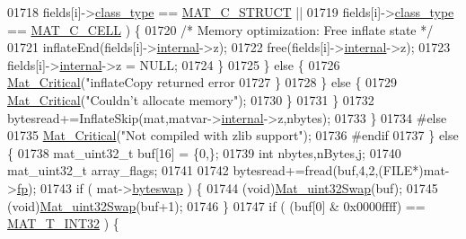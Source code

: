 \begin{DoxyCode}
{{{{{{{{{{{{{{01718                              fields[i]->\hyperlink{group___m_a_t_aff13035bf3265dd7d9425e5d40c839d4}{class\_type} == \hyperlink{group___m_a_t_ggad4d60ae7b709fc81bfd744fb4c857c40acb467c7749c80902b798134c729bb521}{MAT\_C\_STRUCT} ||
01719                              fields[i]->\hyperlink{group___m_a_t_aff13035bf3265dd7d9425e5d40c839d4}{class\_type} == \hyperlink{group___m_a_t_ggad4d60ae7b709fc81bfd744fb4c857c40a2f7abb47a1c51e248bd4e5e03cc81b08}{MAT\_C\_CELL} ) \{
01720                             \textcolor{comment}{/* Memory optimization: Free inflate state */}
01721                             inflateEnd(fields[i]->\hyperlink{namespaceinternal}{internal}->z);
01722                             free(fields[i]->\hyperlink{namespaceinternal}{internal}->z);
01723                             fields[i]->\hyperlink{group___m_a_t_a6e97e3ed9f40c49322c18561c2a94e92}{internal}->z = NULL;
01724                         \}
01725                     \} \textcolor{keywordflow}{else} \{
01726                         \hyperlink{group__mat__util_gaf51f2bfbb5580f575e4dd79757e2b80c}{Mat\_Critical}(\textcolor{stringliteral}{"inflateCopy returned error %
01727                     \}
01728                 \} \textcolor{keywordflow}{else} \{
01729                     \hyperlink{group__mat__util_gaf51f2bfbb5580f575e4dd79757e2b80c}{Mat\_Critical}(\textcolor{stringliteral}{"Couldn't allocate memory"});
01730                 \}
01731             \}
01732             bytesread+=InflateSkip(mat,matvar->\hyperlink{group___m_a_t_a6e97e3ed9f40c49322c18561c2a94e92}{internal}->z,nbytes);
01733         \}
01734 \textcolor{preprocessor}{#else}
01735         \hyperlink{group__mat__util_gaf51f2bfbb5580f575e4dd79757e2b80c}{Mat\_Critical}(\textcolor{stringliteral}{"Not compiled with zlib support"});
01736 \textcolor{preprocessor}{#endif}
01737     \} \textcolor{keywordflow}{else} \{
01738         mat\_uint32\_t buf[16] = \{0,\};
01739         \textcolor{keywordtype}{int} nbytes,nBytes,j;
01740         mat\_uint32\_t array\_flags;
01741 
01742         bytesread+=fread(buf,4,2,(FILE*)mat->\hyperlink{struct__mat__t_a85f562e407ca9ad4d2a6e14f839432b7}{fp});
01743         \textcolor{keywordflow}{if} ( mat->\hyperlink{struct__mat__t_a99d207977af5e04941ace56d71817a40}{byteswap} ) \{
01744             (void)\hyperlink{endian_8c_a8cb0d0750e2eaf9840d95db531934f4f}{Mat\_uint32Swap}(buf);
01745             (void)\hyperlink{endian_8c_a8cb0d0750e2eaf9840d95db531934f4f}{Mat\_uint32Swap}(buf+1);
01746         \}
01747         \textcolor{keywordflow}{if} ( (buf[0] & 0x0000ffff) == \hyperlink{group___m_a_t_ggacf7b3b879282b7ab3a51190e49bf3453a83e06a68320726c6572bfbb9f3addb1d}{MAT\_T\_INT32} ) \{
}}}}}}}}}}}}}}}
\end{DoxyCode}
